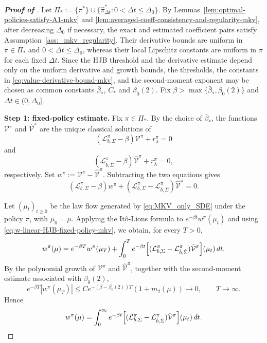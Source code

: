 \documentclass[a4paper, 10pt, english, reqno]{amsart}
\begin{document}
\begin{proof}[\textbf{Proof of
}]
Let $\Pi_*:=\{\pi^*\}\cup \{\hat\pi_{\Delta t}^*:0<\Delta t\le\Delta_0\}$. By Lemmas~\ref{lem:optimal-policies-satisfy-A1-mkv} and \ref{lem:averaged-coeff-consistency-and-regularity-mkv}, after decreasing $\Delta_0$ if necessary, the exact and estimated coefficient pairs satisfy Assumption~\ref{ass:_mkv_regularity}. Their derivative bounds are uniform in $\pi\in\Pi_*$ and $0<\Delta t\le\Delta_0$, whereas their local Lipschitz constants are uniform in $\pi$ for each fixed $\Delta t$. Since the HJB threshold and the derivative estimate depend only on the uniform derivative and growth bounds, the thresholds, the constants in \eqref{eq:value-derivative-bound-mkv}, and the second-moment exponent may be chosen as common constants $\bar\beta_*$, $C_*$ and $\beta_0(2)$. Fix $\beta>\max\{\bar\beta_*,\beta_0(2)\}$ and $\Delta t\in(0,\Delta_0]$.
\medskip

\noindent
\textbf{Step 1: fixed-policy estimate.}
Fix $\pi\in\Pi_*$. By the choice of $\bar\beta_*$, the functions $\mathcal V^\pi$ and $\hat{\mathcal V}^\pi$ are the unique classical solutions of
\[
(\mathcal L_{b,\Sigma}^{\pi}-\beta)\mathcal V^\pi+r_\lambda^\pi=0
\]
and
\[
(\mathcal L_{\hat b,\hat\Sigma}^{\pi}-\beta)\hat{\mathcal V}^\pi+r_\lambda^\pi=0,
\]
respectively. Set $w^\pi:=\mathcal V^\pi-\hat{\mathcal V}^\pi$. Subtracting the two equations gives
\begin{equation}
\label{eq:w-linear-HJB-fixed-policy-mkv}
(\mathcal L_{b,\Sigma}^{\pi}-\beta)w^\pi+
(\mathcal L_{b,\Sigma}^{\pi}-\mathcal L_{\hat b,\hat\Sigma}^{\pi})
\hat{\mathcal V}^\pi=0.
\end{equation}

Let $(\mu_t)_{t\ge0}$ be the law flow generated by \eqref{eq:MKV_only_SDE} under the policy $\pi$, with $\mu_0=\mu$. Applying the It\^o-Lions formula to $e^{-\beta t}w^\pi(\mu_t)$ and using \eqref{eq:w-linear-HJB-fixed-policy-mkv}, we obtain, for every $T>0$,
\[
w^\pi(\mu)=e^{-\beta T}w^\pi(\mu_T)+\int_0^T e^{-\beta t}\Bigl[(\mathcal L_{b,\Sigma}^{\pi}-\mathcal L_{\hat b,\hat\Sigma}^{\pi})\hat{\mathcal V}^\pi\Bigr](\mu_t)\,dt.
\]
By the polynomial growth of $\mathcal V^\pi$ and $\hat{\mathcal V}^\pi$, together with the second-moment estimate associated with $\beta_0(2)$,
\[
e^{-\beta T}|w^\pi(\mu_T)|\le C e^{-(\beta-\beta_0(2))T}(1+m_2(\mu))\longrightarrow0,
\qquad T\to\infty.
\]
Hence
\begin{equation}
\label{eq:w-representation-fixed-policy-mkv}
w^\pi(\mu)=\int_0^\infty e^{-\beta t}\Bigl[(\mathcal L_{b,\Sigma}^{\pi}-\mathcal L_{\hat b,\hat\Sigma}^{\pi})\hat{\mathcal V}^\pi\Bigr](\mu_t)\,dt.
\end{equation}


\end{proof}
\end{document}
